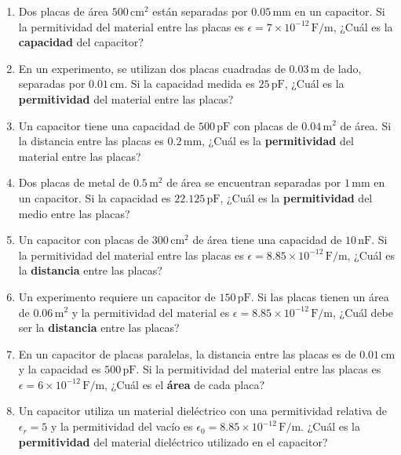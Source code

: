 \documentclass[../main]{subfiles}
\begin{document}
\begin{enumerate}
    \item Dos placas de área $500 \, \text{cm}^2$ están separadas por $0.05 \, \text{mm}$ en un capacitor. Si la permitividad del material entre las placas es $\epsilon = 7 \times 10^{-12} \, \text{F/m}$, ¿Cuál es la \textbf{capacidad} del capacitor?

    \item En un experimento, se utilizan dos placas cuadradas de $0.03 \, \text{m}$ de lado, separadas por $0.01 \, \text{cm}$. Si la capacidad medida es $25 \, \text{pF}$, ¿Cuál es la \textbf{permitividad} del material entre las placas?

    \item Un capacitor tiene una capacidad de $500 \, \text{pF}$ con placas de $0.04 \, \text{m}^2$ de área. Si la distancia entre las placas es $0.2 \, \text{mm}$, ¿Cuál es la \textbf{permitividad} del material entre las placas?

    \item Dos placas de metal de $0.5 \, \text{m}^2$ de área se encuentran separadas por $1 \, \text{mm}$ en un capacitor. Si la capacidad es $22.125 \, \text{pF}$, ¿Cuál es la \textbf{permitividad} del medio entre las placas?

    \item Un capacitor con placas de $300 \, \text{cm}^2$ de área tiene una capacidad de $10 \, \text{nF}$. Si la permitividad del material entre las placas es $\epsilon = 8.85 \times 10^{-12} \, \text{F/m}$, ¿Cuál es la \textbf{distancia} entre las placas?

    \item Un experimento requiere un capacitor de $150 \, \text{pF}$. Si las placas tienen un área de $0.06 \, \text{m}^2$ y la permitividad del material es $\epsilon = 8.85 \times 10^{-12} \, \text{F/m}$, ¿Cuál debe ser la \textbf{distancia} entre las placas?

    \item En un capacitor de placas paralelas, la distancia entre las placas es de $0.01 \, \text{cm}$ y la capacidad es $500 \, \text{pF}$. Si la permitividad del material entre las placas es $\epsilon = 6 \times 10^{-12} \, \text{F/m}$, ¿Cuál es el \textbf{área} de cada placa?

    \item Un capacitor utiliza un material dieléctrico con una permitividad relativa de $\epsilon_r = 5$ y la permitividad del vacío es $\epsilon_0 = 8.85 \times 10^{-12} \, \text{F/m}$. ¿Cuál es la \textbf{permitividad} del material dieléctrico utilizado en el capacitor?


\end{enumerate}
\end{document}
